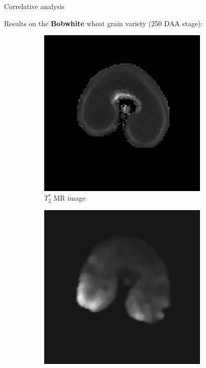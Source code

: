 \documentclass[10pt]{beamer}
\begin{document}
\begin{frame}{Correlative analysis}

  Results on the \textbf{Bobwhite} wheat grain variety (250 DAA stage):

    \begin{figure}[ht]
    \centering
    \begin{subfigure}[t]{0.33\textwidth}
      \centering
      \includegraphics[width=0.9\textwidth]{fig/mri_slice8_250}
      \caption{$T_2^*$ MR image}
      \label{subfig:mri_slice8_250}
    \end{subfigure}%
    \begin{subfigure}[t]{0.33\textwidth}
      \centering
      \includegraphics[width=0.9\textwidth]{fig/ax14_4ac}

\end{subfigure}
\end{figure}
\end{frame}
\end{document}
